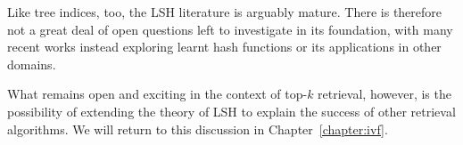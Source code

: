 Like tree indices, too, the LSH literature is arguably mature.
There is therefore not a great deal of open questions left to investigate in its foundation,
with many recent works instead exploring learnt hash functions or
its applications in other domains.

What remains open and exciting in the context of top-$k$ retrieval, however,
is the possibility of extending the theory of LSH to explain the success of
other retrieval algorithms. We will return to this discussion in
Chapter~\ref{chapter:ivf}.



